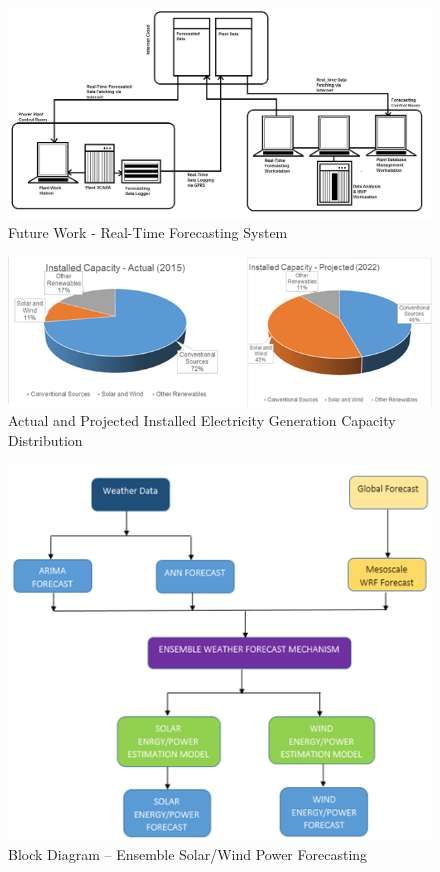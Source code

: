 \documentclass[12pt]{article}
\begin{document}
\begin{figure}[H]
\centering
\includegraphics[scale=0.5]{ProposalDesign}
\caption{Future Work - Real-Time Forecasting System}
\label{figc10h1} %
\end{figure}

\begin{figure}[H]
\centering
\includegraphics[scale=1]{Intro1}
\caption{Actual and Projected Installed Electricity Generation Capacity Distribution}
\label{figc1h1} %
\end{figure}

\begin{figure}[H]
\centering
\includegraphics[scale=1]{Intro2}
\caption{Block Diagram – Ensemble Solar/Wind Power Forecasting}
\label{figc1h1} %
\end{figure}
\end{document}
